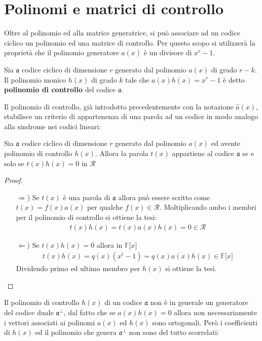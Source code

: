 \section{Polinomi e matrici di controllo}
Oltre al polinomio ed alla matrice generatrice, si può associare ad un codice ciclico un polinomio ed una matrice di controllo. Per questo scopo si utilizzerà la proprietà che il polinomio generatore $a(x)$ è un divisore di $x^r - 1$.
\begin{definizione}
   Sia $\mathfrak{a}$ codice ciclico di dimensione $r$ generato dal polinomio $a(x)$ di grado $r-k$. Il polinomio monico $h(x)$ di grado $k$ tale che $a(x)h(x) = x^r - 1$ è detto {\bf polinomio di controllo} del codice $\mathfrak{a}$.
\end{definizione}
\noindent
Il polinomio di controllo, già introdotto precedentemente con la notazione $\hat{a}(x)$, stabilisce un criterio di appartenenza di una parola ad un codice in modo analogo alla sindrome nei codici lineari:
\begin{teorema}\label{teo:appartenenzaCiclica}
   Sia $\mathfrak{a}$ codice ciclico di dimensione $r$ generato dal polinomio $a(x)$ ed avente polinomio di controllo $h(x)$. Allora la parola $t(x)$ appartiene al codice $\mathfrak{a}$ se e solo se $t(x)h(x) = 0$ in $\mathcal{R}$
\end{teorema}
\begin{proof}
   \begin{itemize}
   \item[$\Rightarrow$)] Se $t(x)$ è una parola di $\mathfrak{a}$ allora può essere scritto come $t(x) = f(x)a(x)$ per qualche $f(x) \in \mathcal{R}$. Moltiplicando ambo i membri per il polinomio di controllo si ottiene la tesi:
   \begin{align*}
     t(x)h(x) = t(x)a(x)h(x) = 0 \in \mathcal{R}
   \end{align*}
   \item[$\Leftarrow$)] Se $t(x)h(x) = 0$ allora in $\mathbb{F} \lbrack x \rbrack $
   \begin{align*}
     t(x)h(x) = q(x)(x^t - 1) =  q(x)a(x)h(x) \in \mathbb{F} \lbrack x \rbrack
   \end{align*}
   Dividendo primo ed ultimo membro per $h(x)$ si ottiene la tesi.
\end{itemize}
\end{proof}
\noindent
Il polinomio di controllo $h(x)$ di un codice $\mathfrak{a}$ non è in generale un generatore del codice duale $\mathfrak{a}^{\perp}$, dal fatto che se $a(x)h(x) = 0$ allora non necessariamente i vettori associati ai polinomi $a(x)$ ed $h(x)$ sono ortogonali. Però i coefficienti di $h(x)$ ed il polinomio che genera $\mathfrak{a}^{\perp}$ non sono del tutto scorrelati:
